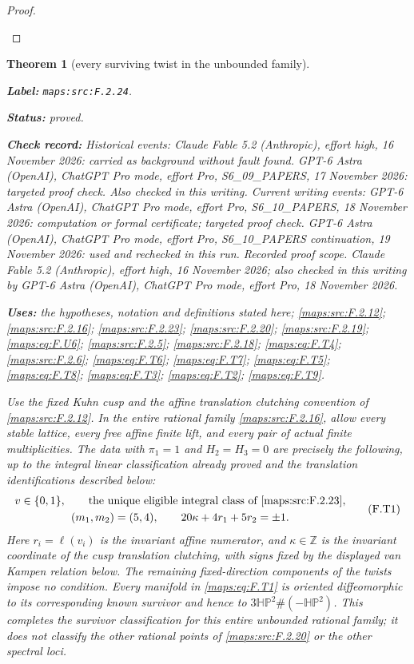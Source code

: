 \documentclass[11pt,a4paper]{article}
\newtheorem{theorem}{Theorem}[section]
\theoremstyle{definition}
\newcommand{\StatementRecord}[4]{\par\smallskip\begingroup\upshape\raggedright\noindent\textbf{Label:} \nolinkurl{#1}.\par\noindent\textbf{Status:} #2.\par\noindent\textbf{Check record:} #3.\par\noindent\textbf{Uses:} #4.\par\endgroup\smallskip}
\begin{document}
\begin{proof}
\begin{enumerate}[label=\arabic*.]
\end{enumerate}
\end{proof}




\begin{theorem}[every surviving twist in the unbounded family]\label{maps:src:F.2.24}
\StatementRecord{maps:src:F.2.24}{proved}{Historical events: Claude Fable 5.2 (Anthropic), effort high, 16 November 2026: carried as background without fault found. GPT-6 Astra (OpenAI), ChatGPT Pro mode, effort Pro, S6\_09\_PAPERS, 17 November 2026: targeted proof check. Also checked in this writing. Current writing events: GPT-6 Astra (OpenAI), ChatGPT Pro mode, effort Pro, S6\_10\_PAPERS, 18 November 2026: computation or formal certificate; targeted proof check. GPT-6 Astra (OpenAI), ChatGPT Pro mode, effort Pro, S6\_10\_PAPERS continuation, 19 November 2026: used and rechecked in this run. \emph{Recorded proof scope.} Claude Fable 5.2 (Anthropic), effort high, 16 November 2026; also checked in this writing by GPT-6 Astra (OpenAI), ChatGPT Pro mode, effort Pro, 18 November 2026}{the hypotheses, notation and definitions stated here; \cref{maps:src:F.2.12}; \cref{maps:src:F.2.16}; \cref{maps:src:F.2.23}; \cref{maps:src:F.2.20}; \cref{maps:src:F.2.19}; \cref{maps:eq:F.U6}; \cref{maps:src:F.2.5}; \cref{maps:src:F.2.18}; \cref{maps:eq:F.T4}; \cref{maps:src:F.2.6}; \cref{maps:eq:F.T6}; \cref{maps:eq:F.T7}; \cref{maps:eq:F.T5}; \cref{maps:eq:F.T8}; \cref{maps:eq:F.T3}; \cref{maps:eq:F.T2}; \cref{maps:eq:F.T9}}


Use the fixed Kuhn cusp and the affine translation clutching
convention of \ref{maps:src:F.2.12}.  In the entire rational family \ref{maps:src:F.2.16},
allow every stable lattice, every free affine finite lift,
and every pair of actual finite multiplicities.
The data with $\pi_1=1$ and $H_2=H_3=0$ are precisely the
following, up to the integral linear classification already
proved and the translation identifications described below:
\[
\begin{gathered}
 v\in\{0,1\},\qquad
 \text{the unique eligible integral class of \ref{maps:src:F.2.23}},\\
 (m_1,m_2)=(5,4),\qquad
 20\kappa+4r_1+5r_2=\pm1.
\end{gathered}
 \tag{F.T1}\label{maps:eq:F.T1}
\]
Here $r_i=\ell(v_i)$ is the invariant affine numerator, and
$\kappa\in\mathbb Z$ is the invariant coordinate of the
cusp translation clutching, with signs fixed by the displayed
van Kampen relation below.  The remaining fixed-direction
components of the twists impose no condition.
Every manifold in \eqref{maps:eq:F.T1} is oriented diffeomorphic to its
corresponding known survivor and hence to
$3\mathbb{HP}^2\#(-\mathbb{HP}^2)$.
This completes the survivor classification for this entire
unbounded rational family; it does not classify the other
rational points of \ref{maps:src:F.2.20} or the other spectral loci.

\end{theorem}
\end{document}
